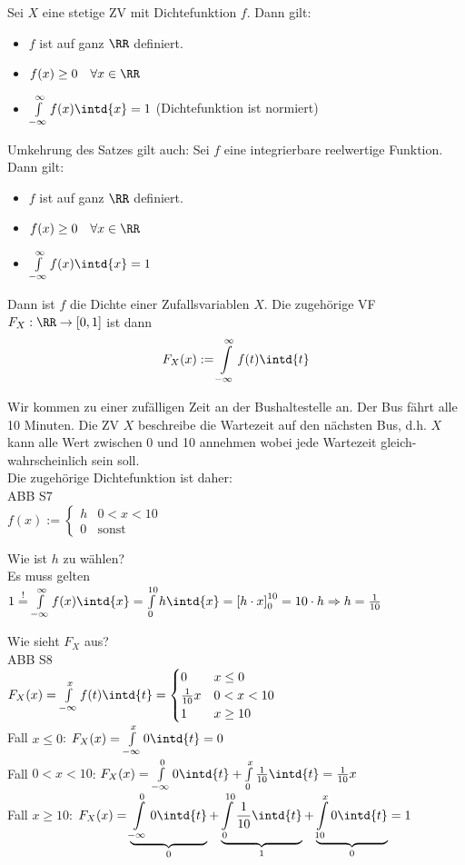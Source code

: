  Sei $X$ eine stetige ZV mit Dichtefunktion $f$. Dann gilt:
\begin{itemize}
\item $f$ ist auf ganz $\RR$ definiert.
\item $f(x)\geq 0 \quad \forall x \in \RR$
\item $\int\limits_{-\infty}^{\infty}f(x)\intd{x}=1$ (Dichtefunktion ist normiert)
\end{itemize}
Umkehrung des Satzes gilt auch:
 Sei $f$ eine integrierbare reelwertige Funktion. Dann gilt: 
\begin{itemize}
\item $f$ ist auf ganz $\RR$ definiert.
\item $f(x)\geq 0 \quad \forall x \in \RR$
\item $\int\limits_{-\infty}^{\infty}f(x)\intd{x}=1$ 
\end{itemize}
Dann ist $f$ die Dichte einer Zufallsvariablen $X$. Die zugehörige VF $F_X:\RR\to [0,1]$ ist dann
$$F_X(x):=\int\limits_{-\infty}^{\infty} f(t) \intd{t}$$

 Wir kommen zu einer zufälligen Zeit an der Bushaltestelle an. Der Bus fährt alle 10 Minuten. Die ZV $X$ beschreibe die Wartezeit auf den nächsten Bus, d.h. $X$ kann alle Wert zwischen 0 und 10 annehmen wobei jede Wartezeit gleich-wahrscheinlich sein soll.\\
Die zugehörige Dichtefunktion ist daher:\\
ABB S7\\
$f(x):=\begin{cases}
h & 0 < x < 10\\
0 & \text{sonst}
\end{cases}$
\begin{anumerate}
\item Wie ist $h$ zu wählen?\\
Es muss gelten $1\overset{!}{=}\int\limits_{-\infty}^{\infty}f(x)\intd{x}=\int\limits_0^{10}h\intd{x}=\left[ h\cdot x\right]_0^{10}=10\cdot h \Rightarrow h = \frac{1}{10}$
\item Wie sieht $F_X$ aus?\\
ABB S8\\
$F_X(x)=\int\limits_{-\infty}^x f(t) \intd{t}=\begin{cases}
0 & x\leq 0\\
\tfrac{1}{10} x & 0 < x < 10\\
1 & x \geq 10
\end{cases}$\\
Fall $x\leq 0$: $F_X(x)=\int\limits_{-\infty}^x 0 \intd{t} = 0$\\
Fall $0<x<10$: $F_X(x)= \int\limits_{-\infty}^0 0 \intd{t} + \int\limits_0^x \frac{1}{10} \intd{t} = \frac{1}{10}x$\\
Fall $x \geq 10$: $F_X(x) = \underbrace{\int\limits_{-\infty}^0 0 \intd{t}}_{0}+ \underbrace{\int\limits_0^{10} \frac{1}{10} \intd{t}}_1 + \underbrace{\int\limits_{10}^x 0 \intd{t}}_0 = 1$
\end{anumerate}

